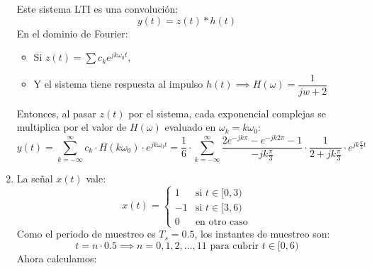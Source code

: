\begin{enumerate}[label=\color{red}\textbf{\alph*)}]
         Este sistema LTI es una convolución: \[
         y(t)=z(t)\ast h(t)
         \] 
         En el dominio de Fourier:
         \begin{itemize}[label=\textbullet]
             \item Si $z(t)=\sum c_ke^{jk\omega_0t} $,
             \item Y el sistema tiene respuesta al impulso $h(t)\implies H(\omega)=\dfrac{1}{jw+2}$ 
         \end{itemize}
         Entonces, al pasar $z(t)$ por el sistema, cada exponencial complejas se multiplica por el valor de  $H(\omega)$ evaluado en $\omega_k=k\omega_0$: \[
         y(t)=\sum_{k=-\infty}^{\infty} c_k\cdot H(k\omega_0)\cdot e^{jk\omega_0t}=\dfrac{1}{6}\cdot \sum_{k=-\infty}^{\infty} \dfrac{2e^{-jk\pi}-e^{-jk 2\pi}-1 }{-jk\frac{\pi}{3}}\cdot \dfrac{1}{2+jk\frac{\pi}{3} } \cdot e^{jk\frac{\pi}{3} t}
         \] 
	\item {}

        La señal $x(t)$ vale:  \[
        x(t)=\begin{cases}
            1 & \text{si }t\in [0,3)\\
            -1 & \text{si }t\in [3,6)\\
            0 & \text{en otro caso}
        \end{cases}
        \] 
        Como el periodo de muestreo es $T_s=0.5$, los instantes de muestreo son:  \[
            t=n\cdot 0.5\implies n=0,1,2,\dots,11 \text{ para cubrir }t\in [0,6)
        \] 
        Ahora calculamos:
        

\end{enumerate}

